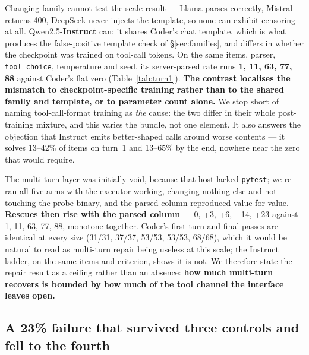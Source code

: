 Changing family cannot test the scale result --- Llama parses correctly, Mistral returns 400,
DeepSeek never injects the template, so none can exhibit censoring at all.
Qwen2.5-\textbf{Instruct} can: it shares Coder's chat template, which is what produces the
false-positive template check of \S\ref{sec:families}, and differs in whether the checkpoint was
trained on tool-call tokens. On the same items, parser, \texttt{tool\_choice}, temperature and
seed, its server-parsed rate runs \textbf{1, 11, 63, 77, 88} against Coder's flat zero
(Table~\ref{tab:turn1}). \textbf{The contrast localises the mismatch to checkpoint-specific
training rather than to the shared family and template, or to parameter count alone.} We stop
short of naming tool-call-format training as \emph{the} cause: the two differ in their whole
post-training mixture, and this varies the bundle, not one element. It also answers the objection
that Instruct emits better-shaped calls around worse contents --- it solves 13--42\% of items on
turn~1 and 13--65\% by the end, nowhere near the zero that would require.

The multi-turn layer was initially void, because that host lacked \texttt{pytest}; we re-ran all
five arms with the executor working, changing nothing else and not touching the probe binary, and
the parsed column reproduced value for value. \textbf{Rescues then rise with the parsed column} ---
0, +3, +6, +14, +23 against 1, 11, 63, 77, 88, monotone together. Coder's first-turn and final
passes are identical at every size (31/31, 37/37, 53/53, 53/53, 68/68), which it would be natural
to read as multi-turn repair being useless at this scale; the Instruct ladder, on the same items
and criterion, shows it is not. We therefore state the repair result as a ceiling rather than an
absence: \textbf{how much multi-turn recovers is bounded by how much of the tool channel the
interface leaves open.}

\subsection{A 23\% failure that survived three controls and fell to the fourth}
\label{sec:llama}


